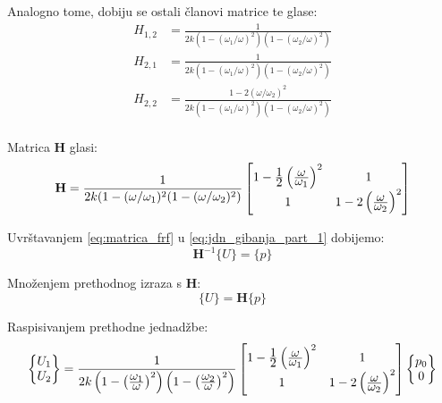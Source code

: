 Analogno tome, dobiju se ostali članovi matrice te glase:
\begin{align}
    H_{1,2} &= \frac{1}{2k(1-(\omega_1/\omega)^2)(1-(\omega_2/\omega)^2)}\label{eq:frf_12}\\
    H_{2,1} &= \frac{1}{2k(1-(\omega_1/\omega)^2)(1-(\omega_2/\omega)^2)}\label{eq:frf_21}\\
    H_{2,2} &= \frac{1-2(\omega/\omega_2)^2}{2k(1-(\omega_1/\omega)^2)(1-(\omega_2/\omega)^2)}\label{eq:frf_22}\\
\end{align}

Matrica $\mathbf{H}$ glasi:
\begin{equation}\label{eq:matrica_frf}
    \mathbf{H}=\frac{1}{2k(1-(\omega/\omega_1)^2(1-(\omega/\omega_2)^2)}
    \begin{bmatrix}
        1-\frac{\displaystyle 1}{\displaystyle 2}\left(\frac{\displaystyle \omega}{\displaystyle \omega_1}\right)^2 & 1 \\
        1 & 1-2\left(\frac{\displaystyle \omega}{\displaystyle \omega_2}\right)^2
    \end{bmatrix}
\end{equation}

Uvrštavanjem \eqref{eq:matrica_frf} u \eqref{eq:jdn_gibanja_part_1} dobijemo:
\begin{equation}
    \mathbf{H}^{-1}\{U\}=\{p\}
\end{equation}

Množenjem prethodnog izraza s $\mathbf{H}$:
\begin{equation}
    \{U\} = \mathbf{H}\{p\}
\end{equation}

Raspisivanjem prethodne jednadžbe:
\begin{equation}
    \begin{Bmatrix}
        U_1\\
        U_2
    \end{Bmatrix}
    =
    \frac{1}{2k\left(1-\left(\frac{\displaystyle \omega_1}{\displaystyle \omega}\right)^2\right)\left(1-\left(\frac{\displaystyle \omega_2}{\displaystyle \omega}\right)^2\right)}
    \begin{bmatrix}
        1-\frac{\displaystyle 1}{\displaystyle 2}\left(\frac{\displaystyle \omega}{\displaystyle \omega_1}\right)^2 & 1 \\
        1 & 1-2\left(\frac{\displaystyle \omega}{\displaystyle \omega_2}\right)^2
    \end{bmatrix}
    \begin{Bmatrix}
        p_0\\
        0
    \end{Bmatrix}
\end{equation}

